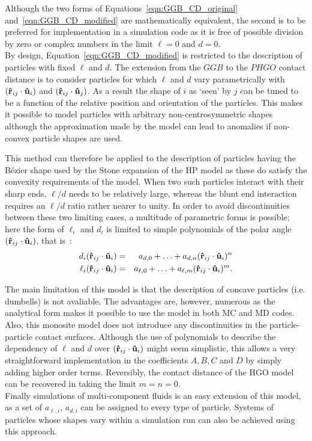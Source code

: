 Although the two forms of Equations~\ref{eqn:GGB_CD_original} and~\ref{eqn:GGB_CD_modified} 
are mathematically equivalent, the second is to be preferred for
implementation in a simulation code as it is free of possible division by zero or complex
numbers in the limit $\ell=0$ and $d = 0$.\\

By design, Equation~\ref{eqn:GGB_CD_modified} is restricted to the description of particles with 
fixed $\ell$ and $d$. The extension from the $GGB$ to the $PHGO$ contact distance is to consider
particles for which $\ell$ and $d$ vary parametrically with $\left( \mathbf{\hat{r} }_{ij} \cdot \mathbf{\hat{u} }_i \right)$ and 
$\left( \mathbf{\hat{r} }_{ij} \cdot \mathbf{\hat{u} }_j \right)$. As a result the shape of $i$ as `seen' by $j$ 
can be tuned to be a function of the relative position and orientation of the particles. 
This makes it possible to model particles with arbitrary non-centrosymmetric shapes although the
approximation made by the model can lead to anomalies if non-convex particle shapes are used.

This method can therefore be applied to the description of particles having the B\'ezier shape used 
by the Stone expansion of the HP model as these do satisfy the convexity requirements of the model.
When two such particles interact with their sharp ends, $\ell/d$ needs to be 
relatively large, whereas the  blunt end interaction requires an $\ell/d$ ratio rather nearer to unity. 
In order to avoid discontinuities between these two limiting cases, a multitude of 
parametric forms is possible; here the form of $\ell_i$ and $d_i$ is limited to simple 
polynomials of the polar angle $\left( \mathbf{\hat{r} }_{ij} \cdot \mathbf{\hat{u} }_i \right)$, that is~:
\begin{eqnarray}
        d_i(\mathbf{\hat{r} }_{ij} \cdot \mathbf{\hat{u} }_i) &=& a_{d,0} +\ldots + a_{d,n}(\mathbf{\hat{r} }_{ij} \cdot \mathbf{\hat{u} }_i)^n\\     
	\label{eqn:drui}
        \ell_i(\mathbf{\hat{r} }_{ij} \cdot \mathbf{\hat{u} }_i) &=& a_{\ell,0} +\ldots + a_{\ell,m}(\mathbf{\hat{r} }_{ij} \cdot \mathbf{\hat{u} }_i)^m.
\end{eqnarray}

The main limitation of this model is that the description of concave
particles (i.e. dumbells) is not avaliable.
The advantages are, however, numerous as the analytical form makes it possible to use the model
in both MC and MD codes. Also, this monosite model does not introduce any discontinuities in
the particle-particle contact surfaces.
Although the use of polynomials to describe the dependency of $\ell$ and $d$ over 
$\left( \mathbf{\hat{r} }_{ij} \cdot \mathbf{\hat{u} }_i \right)$ might seem simplistic, this allows a very
straightforward implementation in the coefficients $A,B,C$ and $D$ by simply adding higher order
terms. Reversibly, the contact distance of the HGO model can be recovered in taking the limit $m=n=0$.\\
Finally simulations of multi-component fluids is an easy extension of this model, as a set of 
$a_{\ell,i}$, $a_{d,i}$ can be assigned to every type of particle. Systems of particles whose
shapes vary within a simulation run can also be achieved using this approach.

